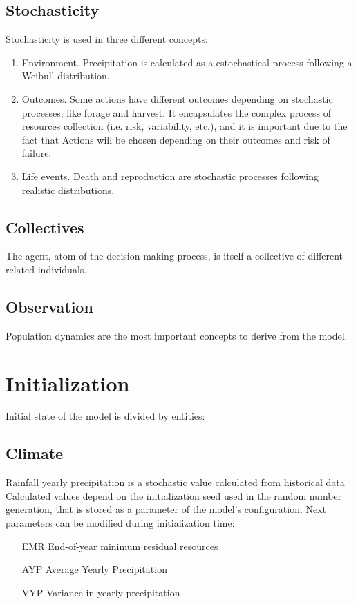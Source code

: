 \documentclass[11pt,oneside,a4paper,openright]{report}
\begin{document}
\subsection{Stochasticity}
Stochasticity is used in three different concepts:
\begin{enumerate}
\item Environment. Precipitation is calculated as a estochastical process following a Weibull
distribution.
\item Outcomes. Some actions have different outcomes depending on stochastic processes,
like forage and harvest. It encapsulates the complex process of resources collection (i.e.
risk, variability, etc.), and it is important due to the fact that Actions will be chosen
depending on their outcomes and risk of failure.
\item Life events. Death and reproduction are stochastic processes following realistic
distributions.
\end{enumerate}

\subsection{Collectives}
The agent, atom of the decision-making process, is itself a collective of different related individuals.
\subsection{Observation}
Population dynamics are the most important concepts to derive from the model.

\section{Initialization}
Initial state of the model is divided by entities:

\subsection{Climate}
Rainfall yearly precipitation is a stochastic value calculated from historical data\cite{RainDataSource}
Calculated values depend on the initialization seed used in the random number generation, that is
stored as a parameter of the model's configuration. Next parameters can be modified during
initialization time:
	\begin{enumerate}
	\item[EMR] End-of-year minimum residual resources
	\item[AYP] Average Yearly Precipitation
	\item[VYP] Variance in yearly precipitation
	\end{enumerate}
\end{document}
